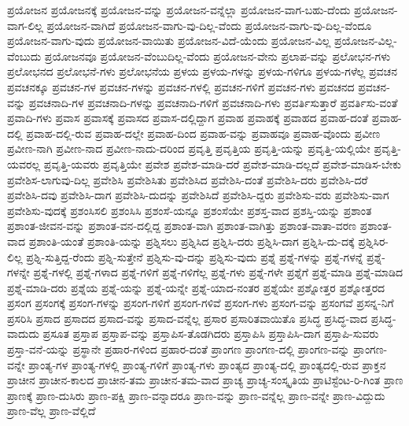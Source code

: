 {ಪ್ರಯೋಜನ
ಪ್ರಯೋಜನಕ್ಕೆ
ಪ್ರಯೋಜನ-ವನ್ನು
ಪ್ರಯೋಜನ-ವನ್ನೆಲ್ಲಾ
ಪ್ರಯೋಜನ-ವಾಗ-ಬಹು-ದೆಂದು
ಪ್ರಯೋಜನ-ವಾಗ-ಲಿಲ್ಲ
ಪ್ರಯೋಜನ-ವಾಗಿದೆ
ಪ್ರಯೋಜನ-ವಾಗು-ವು-ದಿಲ್ಲ-ವೆಂದು
ಪ್ರಯೋಜನ-ವಾಗು-ವು-ದಿಲ್ಲ-ವೆಂದೂ
ಪ್ರಯೋಜನ-ವಾಗು-ವುದು
ಪ್ರಯೋಜನ-ವಾಯಿತು
ಪ್ರಯೋಜನ-ವಿದೆ-ಯೆಂದು
ಪ್ರಯೋಜನ-ವಿಲ್ಲ
ಪ್ರಯೋಜನ-ವಿಲ್ಲ-ವೆಂಬುದು
ಪ್ರಯೋಜನವೂ
ಪ್ರಯೋಜನ-ವೆಂಬುದಿಲ್ಲ-ವೆಂದು
ಪ್ರಯೋಜನ-ವೇನು
ಪ್ರಲಾಪ-ವನ್ನು
ಪ್ರಲೋಭನ-ಗಳು
ಪ್ರಲೋಭನದ
ಪ್ರಲೋಭನೆ-ಗಳು
ಪ್ರಲೋಭನೆಯ
ಪ್ರಳಯ
ಪ್ರಳಯ-ಗಳನ್ನು
ಪ್ರಳಯ-ಗಳಿಗೂ
ಪ್ರಳಯ-ಗಳೆಲ್ಲ
ಪ್ರವಚನ
ಪ್ರವಚನಕ್ಕೂ
ಪ್ರವಚನ-ಗಳ
ಪ್ರವಚನ-ಗಳನ್ನು
ಪ್ರವಚನ-ಗಳಲ್ಲಿ
ಪ್ರವಚನ-ಗಳಿಗೆ
ಪ್ರವಚನ-ಗಳು
ಪ್ರವಚನದ
ಪ್ರವಚನ-ವನ್ನು
ಪ್ರವಚನಾದಿ-ಗಳ
ಪ್ರವಚನಾದಿ-ಗಳನ್ನು
ಪ್ರವಚನಾದಿ-ಗಳಿಗೆ
ಪ್ರವಚನಾದಿ-ಗಳು
ಪ್ರವರ್ತಿಸುತ್ತಾರೆ
ಪ್ರವರ್ತಿಸು-ವಂತೆ
ಪ್ರವಾದಿ-ಗಳು
ಪ್ರವಾಸ
ಪ್ರವಾಸಕ್ಕೆ
ಪ್ರವಾಸದ
ಪ್ರವಾಸ-ದಲ್ಲಿದ್ದಾಗ
ಪ್ರವಾಹ
ಪ್ರವಾಹಕ್ಕೆ
ಪ್ರವಾಹದ
ಪ್ರವಾಹ-ದಂತೆ
ಪ್ರವಾಹ-ದಲ್ಲಿ
ಪ್ರವಾಹ-ದಲ್ಲಿ-ರುವ
ಪ್ರವಾಹ-ದಲ್ಲೇ
ಪ್ರವಾಹ-ದಿಂದ
ಪ್ರವಾಹ-ವನ್ನು
ಪ್ರವಾಹವೂ
ಪ್ರವಾಹ-ವೊಂದು
ಪ್ರವೀಣ
ಪ್ರವೀಣ-ನಾಗಿ
ಪ್ರವೀಣ-ನಾದ
ಪ್ರವೀಣ-ನಾದು-ದರಿಂದ
ಪ್ರವೃತ್ತಿ
ಪ್ರವೃತ್ತಿಯ
ಪ್ರವೃತ್ತಿ-ಯನ್ನು
ಪ್ರವೃತ್ತಿ-ಯಲ್ಲಿಯೇ
ಪ್ರವೃತ್ತಿ-ಯವರಲ್ಲ
ಪ್ರವೃತ್ತಿ-ಯವರು
ಪ್ರವೃತ್ತಿಯೇ
ಪ್ರವೇಶ
ಪ್ರವೇಶ-ಮಾಡಿ-ದರೆ
ಪ್ರವೇಶ-ಮಾಡಿ-ದಲ್ಲದೆ
ಪ್ರವೇಶ-ಮಾಡಿಸ-ಬೇಕು
ಪ್ರವೇಶಿಸ-ಲಾಗುವು-ದಿಲ್ಲ
ಪ್ರವೇಶಿಸಿ
ಪ್ರವೇಶಿಸಿತು
ಪ್ರವೇಶಿಸಿದ
ಪ್ರವೇಶಿಸಿ-ದಂತೆ
ಪ್ರವೇಶಿಸಿ-ದರು
ಪ್ರವೇಶಿಸಿ-ದರೆ
ಪ್ರವೇಶಿಸಿ-ದವು
ಪ್ರವೇಶಿಸಿ-ದಾಗ
ಪ್ರವೇಶಿಸಿ-ದುದನ್ನು
ಪ್ರವೇಶಿಸಿದೆ
ಪ್ರವೇಶಿಸಿ-ದ್ದರು
ಪ್ರವೇಶಿಸು-ವರು
ಪ್ರವೇಶಿಸು-ವಾಗ
ಪ್ರವೇಶಿಸು-ವುದಕ್ಕೆ
ಪ್ರಶಂಸಿಸಲಿ
ಪ್ರಶಂಸಿಸಿ
ಪ್ರಶಂಸೆ-ಯನ್ನೂ
ಪ್ರಶಂಸೆಯೇ
ಪ್ರಶಸ್ತ-ವಾದ
ಪ್ರಶಸ್ತಿ-ಯನ್ನು
ಪ್ರಶಾಂತ
ಪ್ರಶಾಂತ-ಜೀವನ-ವನ್ನು
ಪ್ರಶಾಂತ-ವನ-ದಲ್ಲಿದ್ದ
ಪ್ರಶಾಂತ-ವಾಗಿ
ಪ್ರಶಾಂತ-ವಾಗಿತ್ತು
ಪ್ರಶಾಂತ-ವಾತಾ-ವರಣ
ಪ್ರಶಾಂತ-ವಾದ
ಪ್ರಶಾಂತಿ-ಯಂತೆ
ಪ್ರಶಾಂತಿ-ಯನ್ನು
ಪ್ರಶ್ನಿಸಲು
ಪ್ರಶ್ನಿಸಿದ
ಪ್ರಶ್ನಿಸಿ-ದರು
ಪ್ರಶ್ನಿಸಿ-ದಾಗ
ಪ್ರಶ್ನಿಸಿ-ದು-ದಕ್ಕೆ
ಪ್ರಶ್ನಿಸಿರ-ಲಿಲ್ಲ
ಪ್ರಶ್ನಿ-ಸುತ್ತಿದ್ದ-ರೆಂದು
ಪ್ರಶ್ನಿ-ಸುತ್ತೇನೆ
ಪ್ರಶ್ನಿಸು-ವು-ದನ್ನು
ಪ್ರಶ್ನಿಸು-ವುದು
ಪ್ರಶ್ನೆ
ಪ್ರಶ್ನೆ-ಗಳನ್ನು
ಪ್ರಶ್ನೆ-ಗಳನ್ನೆ
ಪ್ರಶ್ನೆ-ಗಳನ್ನೇ
ಪ್ರಶ್ನೆ-ಗಳಲ್ಲಿ
ಪ್ರಶ್ನೆ-ಗಳಾದ
ಪ್ರಶ್ನೆ-ಗಳಿಗೆ
ಪ್ರಶ್ನೆ-ಗಳಿಗೆಲ್ಲ
ಪ್ರಶ್ನೆ-ಗಳು
ಪ್ರಶ್ನೆ-ಗಳೇ
ಪ್ರಶ್ನೆಗೆ
ಪ್ರಶ್ನೆ-ಮಾಡಿ
ಪ್ರಶ್ನೆ-ಮಾಡಿದ
ಪ್ರಶ್ನೆ-ಮಾಡಿ-ದರು
ಪ್ರಶ್ನೆಯ
ಪ್ರಶ್ನೆ-ಯನ್ನು
ಪ್ರಶ್ನೆ-ಯನ್ನೇ
ಪ್ರಶ್ನೆ-ಯಾದ-ನಂತರ
ಪ್ರಶ್ನೆಯೇ
ಪ್ರಶ್ನೋತ್ತರ
ಪ್ರಶ್ನೋತ್ತರದ
ಪ್ರಸಂಗ
ಪ್ರಸಂಗಕ್ಕೆ
ಪ್ರಸಂಗ-ಗಳನ್ನು
ಪ್ರಸಂಗ-ಗಳಿಗೆ
ಪ್ರಸಂಗ-ಗಳಿವೆ
ಪ್ರಸಂಗ-ಗಳು
ಪ್ರಸಂಗ-ವನ್ನು
ಪ್ರಸಂಗವೆ
ಪ್ರಸನ್ನ-ನಿಗೆ
ಪ್ರಸರಿಸಿ
ಪ್ರಸಾದ
ಪ್ರಸಾದದ
ಪ್ರಸಾದ-ವನ್ನು
ಪ್ರಸಾದ-ವನ್ನೆಲ್ಲ
ಪ್ರಸಾರ
ಪ್ರಸಾರಿತವಾಯಿತೊ
ಪ್ರಸಿದ್ಧ
ಪ್ರಸಿದ್ಧ-ವಾದ
ಪ್ರಸಿದ್ಧ-ವಾದುದು
ಪ್ರಸೂತ
ಪ್ರಸ್ತಾಪ
ಪ್ರಸ್ತಾಪ-ವನ್ನು
ಪ್ರಸ್ತಾಪಿಸ-ತೊಡಗಿದರು
ಪ್ರಸ್ತಾಪಿಸಿ
ಪ್ರಸ್ತಾಪಿಸಿ-ದಾಗ
ಪ್ರಸ್ತಾಪಿ-ಸುವರು
ಪ್ರಸ್ತಾ-ವನೆ-ಯನ್ನು
ಪ್ರಸ್ಥಾನೇ
ಪ್ರಹಾರ-ಗಳಿಂದ
ಪ್ರಹಾರ-ದಂತೆ
ಪ್ರಾಂಗಣ
ಪ್ರಾಂಗಣ-ದಲ್ಲಿ
ಪ್ರಾಂಗಣ-ವನ್ನು
ಪ್ರಾಂಗಣ-ವನ್ನೇ
ಪ್ರಾಂತ್ಯ-ಗಳ
ಪ್ರಾಂತ್ಯ-ಗಳಲ್ಲಿ
ಪ್ರಾಂತ್ಯ-ಗಳಿಗೆ
ಪ್ರಾಂತ್ಯ-ಗಳು
ಪ್ರಾಂತ್ಯದ
ಪ್ರಾಂತ್ಯ-ದಲ್ಲಿ
ಪ್ರಾಂತ್ಯದಲ್ಲಿ-ರುವ
ಪ್ರಾಕ್ತನ
ಪ್ರಾಚೀನ
ಪ್ರಾಚೀನ-ಕಾಲದ
ಪ್ರಾಚೀನ-ತಮ
ಪ್ರಾಚೀನ-ತಮ-ವಾದ
ಪ್ರಾಚ್ಯ
ಪ್ರಾಚ್ಯ-ಸಂಸ್ಕೃತಿಯ
ಪ್ರಾಟಿಸ್ಟೆಂಟ-ರಿ-ಗಿಂತ
ಪ್ರಾಣ
ಪ್ರಾಣಕ್ಕೆ
ಪ್ರಾಣ-ದುಸಿರು
ಪ್ರಾಣ-ಪಕ್ಷಿ
ಪ್ರಾಣ-ವನ್ನಾದರೂ
ಪ್ರಾಣ-ವನ್ನು
ಪ್ರಾಣ-ವನ್ನೆಲ್ಲ
ಪ್ರಾಣ-ವನ್ನೇ
ಪ್ರಾಣ-ವಿದ್ದುದು
ಪ್ರಾಣ-ವೆಲ್ಲ
ಪ್ರಾಣ-ವೆಲ್ಲಿದೆ
}
